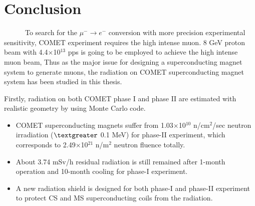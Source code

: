 %
%

\chapter{Conclusion}
~~~~~~To search for the $\mu^- \rightarrow e^-$ conversion with more precision experimental sensitivity, COMET experiment requires the high intense muon.
8 GeV proton beam with 4.4$\times$10$^{13}$ pps is going to be employed to achieve the high intense muon beam, Thus as the major issue for designing a superconducting magnet system to generate muons, the radiation on COMET superconducting magnet system has been studied in this thesis.

Firstly, radiation on both COMET phase I and phase II are estimated with realistic geometry by using Monte Carlo code.
\begin{itemize}
 \setlength{\itemsep}{-5pt}
 \item COMET superconducting magnets suffer from 1.03$\times$10$^{10}$ n/cm$^2$/sec neutron irradiation ($\textgreater$ 0.1 MeV) for phase-II experiment, which corresponds to 2.49$\times$10$^{21}$ n/m$^2$ neutron fluence totally.
 \item About 3.74 mSv/h residual radiation is still remained after 1-month operation and 10-month cooling for phase-I experiment.
 \item A new radiation shield is designed for both phase-I and phase-II experiment to protect CS and MS superconducting coils from the radiation.
\end{itemize}

